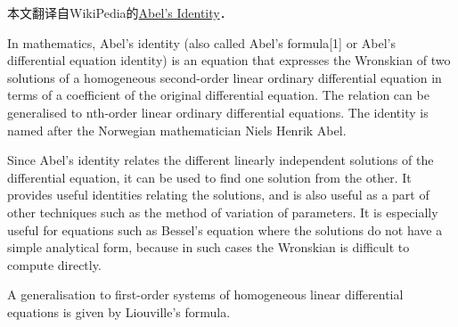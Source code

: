
本文翻译自WikiPedia的\href{https://en.wikipedia.org/wiki/Abel\%27s_identity}{Abel's Identity}．





In mathematics, Abel's identity (also called Abel's formula[1] or Abel's differential equation identity) is an equation that expresses the Wronskian of two solutions of a homogeneous second-order linear ordinary differential equation in terms of a coefficient of the original differential equation. The relation can be generalised to nth-order linear ordinary differential equations. The identity is named after the Norwegian mathematician Niels Henrik Abel.

Since Abel's identity relates the different linearly independent solutions of the differential equation, it can be used to find one solution from the other. It provides useful identities relating the solutions, and is also useful as a part of other techniques such as the method of variation of parameters. It is especially useful for equations such as Bessel's equation where the solutions do not have a simple analytical form, because in such cases the Wronskian is difficult to compute directly.

A generalisation to first-order systems of homogeneous linear differential equations is given by Liouville's formula.







